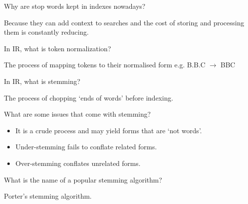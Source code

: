 \documentclass[2by4,grid]{flashcards}
\begin{document}
\begin{flashcard}{Why are stop words kept in indexes nowadays?}
	\begin{center}
        Because they can add context to searches and the cost of storing and processing them is constantly reducing.
	\end{center}
\end{flashcard}

\begin{flashcard}{In IR, what is token normalization?}
	\begin{center}
        The process of mapping tokens to their normalised form e.g. B.B.C $\rightarrow$ BBC
	\end{center}
\end{flashcard}

\begin{flashcard}{In IR, what is stemming?}
	\begin{center}
        The process of chopping `ends of words' before indexing.
	\end{center}
\end{flashcard}

\begin{flashcard}{What are some issues that come with stemming?}
	\begin{center}
        \begin{itemize}
            \item It is a crude process and may yield forms that are `not words'.
            \item Under-stemming fails to conflate related forms.
            \item Over-stemming conflates unrelated forms.
        \end{itemize}
	\end{center}
\end{flashcard}

\begin{flashcard}{What is the name of a popular stemming algorithm?}
	\begin{center}
        Porter's stemming algorithm.
	\end{center}
\end{flashcard}
\end{document}
